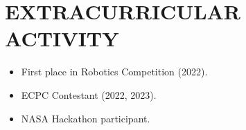 \documentclass[11pt,a4paper]{article}
\begin{document}
\section*{\fontsize{14}{18}\textbf\selectfont EXTRACURRICULAR ACTIVITY}
\vspace{-0.3cm}
\begin{itemize}[noitemsep, left=0pt, itemsep=5pt]
\item First place in Robotics Competition (2022).
\item ECPC Contestant (2022, 2023).
\item NASA Hackathon participant.
\end{itemize}
\vspace{-0.6cm}
\end{document}

